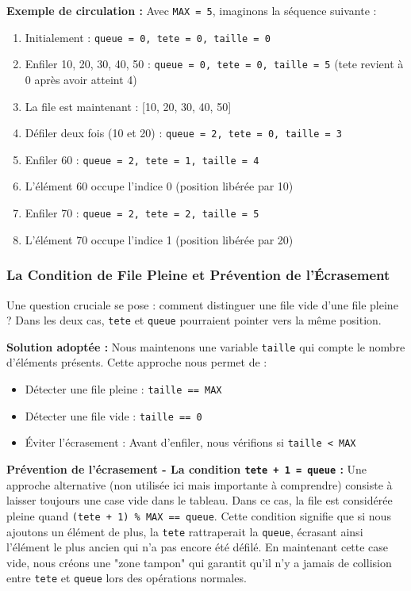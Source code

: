 \documentclass[a4paper, 11pt]{article}
\begin{document}
\textbf{Exemple de circulation :} Avec \texttt{MAX = 5}, imaginons la séquence suivante :
\begin{enumerate}
    \item Initialement : \texttt{queue = 0, tete = 0, taille = 0}
    \item Enfiler 10, 20, 30, 40, 50 : \texttt{queue = 0, tete = 0, taille = 5} (tete revient à 0 après avoir atteint 4)
    \item La file est maintenant : [10, 20, 30, 40, 50]
    \item Défiler deux fois (10 et 20) : \texttt{queue = 2, tete = 0, taille = 3}
    \item Enfiler 60 : \texttt{queue = 2, tete = 1, taille = 4}
    \item L'élément 60 occupe l'indice 0 (position libérée par 10)
    \item Enfiler 70 : \texttt{queue = 2, tete = 2, taille = 5}
    \item L'élément 70 occupe l'indice 1 (position libérée par 20)
\end{enumerate}

\subsubsection*{La Condition de File Pleine et Prévention de l'Écrasement}
Une question cruciale se pose : comment distinguer une file vide d'une file pleine ? Dans les deux cas, \texttt{tete} et \texttt{queue} pourraient pointer vers la même position.

\textbf{Solution adoptée :} Nous maintenons une variable \texttt{taille} qui compte le nombre d'éléments présents. Cette approche nous permet de :
\begin{itemize}
    \item Détecter une file pleine : \texttt{taille == MAX}
    \item Détecter une file vide : \texttt{taille == 0}
    \item Éviter l'écrasement : Avant d'enfiler, nous vérifions si \texttt{taille < MAX}
\end{itemize}

\textbf{Prévention de l'écrasement - La condition \texttt{tete + 1 = queue} :}
Une approche alternative (non utilisée ici mais importante à comprendre) consiste à laisser toujours une case vide dans le tableau. Dans ce cas, la file est considérée pleine quand \texttt{(tete + 1) \% MAX == queue}. Cette condition signifie que si nous ajoutons un élément de plus, la \texttt{tete} rattraperait la \texttt{queue}, écrasant ainsi l'élément le plus ancien qui n'a pas encore été défilé. En maintenant cette case vide, nous créons une "zone tampon" qui garantit qu'il n'y a jamais de collision entre \texttt{tete} et \texttt{queue} lors des opérations normales.
\end{document}
